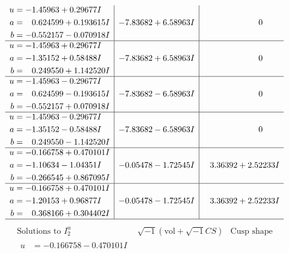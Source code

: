 \documentclass[1p]{elsarticle_modified}
\theoremstyle{definition}
\newcommand{\I}{\sqrt{-1}}
\begin{document}
$$\begin{array}{c|c|c}
\begin{aligned}
u &= -1.45963 + 0.29677 I \\
a &= \phantom{-}0.624599 + 0.193615 I \\
b &= -0.552157 - 0.070918 I\end{aligned}
 & -7.83682 + 6.58963 I & \phantom{-0.000000 } 0 \\ \hline\begin{aligned}
u &= -1.45963 + 0.29677 I \\
a &= -1.35152 + 0.58488 I \\
b &= \phantom{-}0.249550 + 1.142520 I\end{aligned}
 & -7.83682 + 6.58963 I & \phantom{-0.000000 } 0 \\ \hline\begin{aligned}
u &= -1.45963 - 0.29677 I \\
a &= \phantom{-}0.624599 - 0.193615 I \\
b &= -0.552157 + 0.070918 I\end{aligned}
 & -7.83682 - 6.58963 I & \phantom{-0.000000 } 0 \\ \hline\begin{aligned}
u &= -1.45963 - 0.29677 I \\
a &= -1.35152 - 0.58488 I \\
b &= \phantom{-}0.249550 - 1.142520 I\end{aligned}
 & -7.83682 - 6.58963 I & \phantom{-0.000000 } 0 \\ \hline\begin{aligned}
u &= -0.166758 + 0.470101 I \\
a &= -1.10634 - 1.04351 I \\
b &= -0.266545 + 0.867095 I\end{aligned}
 & -0.05478 - 1.72545 I & \phantom{-}3.36392 + 2.52233 I \\ \hline\begin{aligned}
u &= -0.166758 + 0.470101 I \\
a &= -1.20153 + 0.96877 I \\
b &= \phantom{-}0.368166 + 0.304402 I\end{aligned}
 & -0.05478 - 1.72545 I & \phantom{-}3.36392 + 2.52233 I\\
 \hline 
 \end{array}$$\newpage$$\begin{array}{c|c|c}  
\text{Solutions to }I^u_{2}& \I (\text{vol} + \sqrt{-1}CS) & \text{Cusp shape}\\
 \hline 
\begin{aligned}
u &= -0.166758 - 0.470101 I \\

\end{aligned}
\end{array}$$
\end{document}
